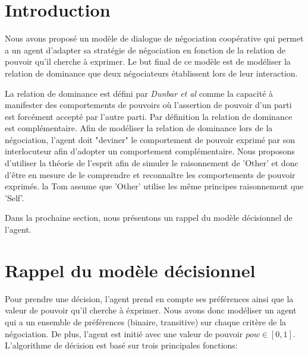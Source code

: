 \documentclass[runningheads,a4paper]{llncs}
\begin{document}
	\section{Introduction}
Nous avons proposé un modèle de dialogue de négociation coopérative  qui permet a un agent d'adapter sa stratégie de négociation en fonction de la relation de pouvoir qu'il cherche à exprimer. 
Le but final de ce modèle est  de modéliser la relation de dominance que deux négociateurs établissent lors de leur interaction. 
\par La relation de dominance est défini par \emph{Dunbar et \textit{al}} comme la capacité  à manifester des comportements de pouvoirs o\`u l'assertion de pouvoir d'un parti est forcément accepté par l'autre parti. Par définition la relation de dominance est complémentaire. 
Afin de modéliser la relation de dominance lors de la négociation, l'agent doit "deviner" le comportement de pouvoir exprimé par son interlocuteur afin d'adopter un comportement complémentaire. 
Nous proposons d'utiliser la théorie de l'esprit afin de simuler le raisonnement de 'Other' et donc d'être en mesure de le comprendre et reconnaître les comportements de pouvoir exprimés. la Tom assume que 'Other'  utilise les même principes raisonnement que 'Self'. 

Dans la prochaine section, nous présentons un rappel du modèle décisionnel de l'agent. 

%	
%	
%	

\section{Rappel du modèle décisionnel}
Pour prendre une décision, l'agent prend en compte ses préférences ainsi que la valeur de pouvoir qu'il cherche à éxprimer. Nous avons donc modéliser un agent qui a un ensemble de préférences (binaire, transitive) sur chaque critère de la négociation. De plus, l'agent est initié avec une valeur de pouvoir $pow \in [0, 1]$. L'algorithme de décision est basé sur trois principales fonctions:
\end{document}
